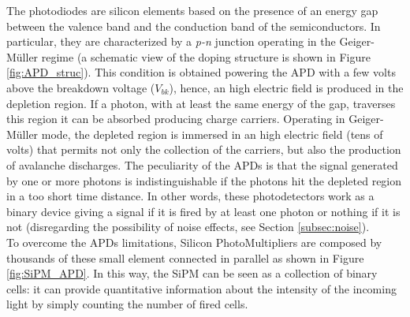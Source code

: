 The photodiodes are silicon elements based on the presence of an energy gap between the valence band and the conduction band of the semiconductors. In particular, they are characterized by a \textit{p-n} junction operating in the Geiger-M\"uller regime (a schematic view of the doping structure is shown in Figure \ref{fig:APD_struc}). This condition is obtained powering the APD with a few volts above the breakdown voltage ($V_{bk}$), hence, an high electric field is produced in the depletion region.
If a photon, with at least the same energy of the gap, traverses this region it can be absorbed producing charge carriers.
Operating in Geiger-M\"uller mode, the depleted region is immersed in an high electric field (tens of volts) that permits not only the collection of the carriers, but also the production of avalanche discharges. 
The peculiarity of the APDs is that the signal generated by one or more photons is indistinguishable if the photons hit the depleted region in a too short time distance. In other words, these photodetectors work as a binary device giving a signal if it is fired by at least one photon or nothing if it is not (disregarding the possibility of noise effects, see Section \ref{subsec:noise}).\\
To overcome the APDs limitations, Silicon PhotoMultipliers are composed by thousands of these small element connected in parallel as shown in Figure \ref{fig:SiPM_APD}. In this way, the SiPM can be seen as a collection of binary cells: it can provide quantitative information about the intensity of the incoming light by simply counting the number of fired cells.

